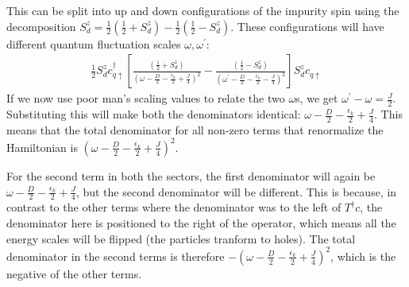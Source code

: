 \documentclass[12pt]{revtex4-2}
\begin{document}
This can be split into up and down configurations of the impurity spin using the decomposition \(S_d^z = \frac{1}{2}\left(\frac{1}{2} + S_d^z\right) - \frac{1}{2}\left(\frac{1}{2} - S_d^z \right) \). These configurations will have different quantum fluctuation scales \(\omega, \omega^\prime\):
\begin{align}
	\frac{1}{2}S_d^z c^\dagger_{q \uparrow}\left[\frac{\left(\frac{1}{2} + S_d^z\right)}{\left(\omega - \frac{D}{2} - \frac{\epsilon_k}{2} + \frac{J}{4}\right)^2} - \frac{\left(\frac{1}{2} - S_d^z\right)}{\left(\omega^\prime - \frac{D}{2} - \frac{\epsilon_k}{2} - \frac{J}{4}\right)^2}\right]S_d^z c_{q \uparrow}
\end{align}
If we now use poor man's scaling values to relate the two \(\omega\)s, we get \(\omega^\prime - \omega = \frac{J}{2}\). Substituting this will make both the denominators identical: \(\omega - \frac{D}{2} - \frac{\epsilon_k}{2} + \frac{J}{4}\). This means that the total denominator for all non-zero terms that renormalize the Hamiltonian is \(\left(\omega - \frac{D}{2} -  \frac{\epsilon_k}{2} + \frac{J}{4}\right)^2\).

For the second term in both the sectors, the first denominator will again be \(\omega - \frac{D}{2} - \frac{\epsilon_k}{2} + \frac{J}{4}\), but the second denominator will be different. This is because, in contrast to the other terms where the denominator was to the left of \(T^\dagger c\), the denominator here is positioned to the right of the operator, which means all the energy scales will be flipped (the particles tranform to holes). The total denominator in the second terms is therefore \(-\left(\omega - \frac{D}{2} -  \frac{\epsilon_k}{2} + \frac{J}{4}\right)^2\), which is the negative of the other terms.
\end{document}
